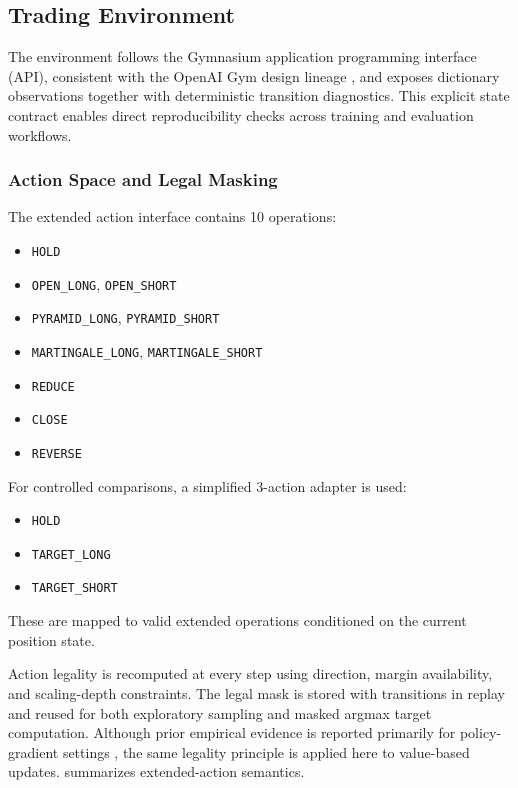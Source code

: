 

\subsection{Trading Environment}
The environment follows the Gymnasium application programming interface (API), consistent with the OpenAI Gym design lineage \citep{brockman2016openai}, and exposes dictionary observations together with deterministic transition diagnostics. This explicit state contract enables direct reproducibility checks across training and evaluation workflows.

\subsubsection{Action Space and Legal Masking}

The extended action interface contains 10 operations:
\begin{itemize}
    \item \texttt{HOLD}
    \item \texttt{OPEN\_LONG}, \texttt{OPEN\_SHORT}
    \item \texttt{PYRAMID\_LONG}, \texttt{PYRAMID\_SHORT}
    \item \texttt{MARTINGALE\_LONG}, \texttt{MARTINGALE\_SHORT}
    \item \texttt{REDUCE}
    \item \texttt{CLOSE}
    \item \texttt{REVERSE}
\end{itemize}

For controlled comparisons, a simplified 3-action adapter is used:
\begin{itemize}
    \item \texttt{HOLD}
    \item \texttt{TARGET\_LONG}
    \item \texttt{TARGET\_SHORT}
\end{itemize}
These are mapped to valid extended operations conditioned on the current position state.

Action legality is recomputed at every step using direction, margin availability, and scaling-depth constraints. The legal mask is stored with transitions in replay and reused for both exploratory sampling and masked argmax target computation. Although prior empirical evidence is reported primarily for policy-gradient settings \citep{huang2020closer}, the same legality principle is applied here to value-based updates.  summarizes extended-action semantics.


